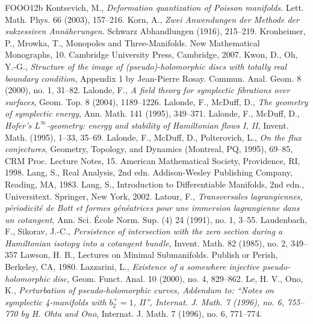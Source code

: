 \begin{thebibliography}{FOOO12b}
 Kontsevich, M., \textit{Deformation quantization of Poisson manifolds.} Lett. Math. Phys. 66 (2003), 157--216.
 Korn, A., \textit{Zwei Anwendungen der Methode der sukzessiven Annäherungen.} Schwarz Abhandlungen (1916), 215--219.
 Kronheimer, P., Mrowka, T., Monopoles and Three-Manifolds. New Mathematical Monographs, 10. Cambridge University Press, Cambridge, 2007.
 Kwon, D., Oh, Y.-G., \textit{Structure of the image of (pseudo)-holomorphic discs with totally real boundary condition}, Appendix 1 by Jean-Pierre Rosay. Commun. Anal. Geom. 8 (2000), no. 1, 31--82.
 Lalonde, F., \textit{A field theory for symplectic fibrations over surfaces}, Geom. Top. 8 (2004), 1189--1226.
 Lalonde, F., McDuff, D., \textit{The geometry of symplectic energy}, Ann. Math. 141 (1995), 349--371.
 Lalonde, F., McDuff, D., \textit{Hofer\textquoteright{}s $L^\infty$-geometry: energy and stability of Hamiltonian flows I, II}, Invent. Math. (1995), 1--33, 35--69.
 Lalonde, F., McDuff, D., Polterovich, L., \textit{On the flux conjectures}, Geometry, Topology, and Dynamics (Montreal, PQ, 1995), 69--85, CRM Proc. Lecture Notes, 15. American Mathematical Society, Providence, RI, 1998.
 Lang, S., Real Analysis, 2nd edn. Addison-Wesley Publishing Company, Reading, MA, 1983.
 Lang, S., Introduction to Differentiable Manifolds, 2nd edn., Universitext. Springer, New York, 2002.
 Latour, F., \textit{Transversales lagrangiennes, périodicité de Bott et formes généatrices pour une immersion lagrangienne dans un cotangent}, Ann. Sci. École Norm. Sup. (4) 24 (1991), no. 1, 3--55.
 Laudenbach, F., Sikorav, J.-C., \textit{Persistence of intersection with the zero section during a Hamiltonian isotopy into a cotangent bundle}, Invent. Math. 82 (1985), no. 2, 349--357
 Lawson, H. B., Lectures on Minimal Submanifolds. Publish or Perish, Berkeley, CA, 1980.
 Lazzarini, L., \textit{Existence of a somewhere injective pseudo-holomorphic disc}, Geom. Funct. Anal. 10 (2000), no. 4, 829--862.
 Le, H. V., Ono, K., \textit{Perturbation of pseudo-holomorphic curves, Addendum to: \textquotedblleft{}Notes on symplectic 4-manifolds with $b_2^+=1$, II\textquotedblright{}, Internat. J. Math. 7 (1996), no. 6, 755--770 by H. Ohta and Ono}, Internat. J. Math. 7 (1996), no. 6, 771--774.

\end{thebibliography}
